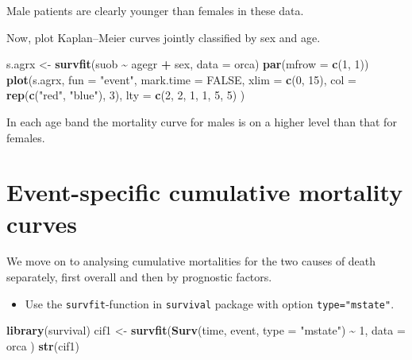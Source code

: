 \documentclass[
]{book}
\newenvironment{Shaded}{\begin{snugshade}}{\end{snugshade}}
\newcommand{\AttributeTok}[1]{\textcolor[rgb]{0.13,0.29,0.53}{#1}}
\newcommand{\ConstantTok}[1]{\textcolor[rgb]{0.56,0.35,0.01}{#1}}
\newcommand{\DecValTok}[1]{\textcolor[rgb]{0.00,0.00,0.81}{#1}}
\newcommand{\FunctionTok}[1]{\textcolor[rgb]{0.13,0.29,0.53}{\textbf{#1}}}
\newcommand{\NormalTok}[1]{#1}
\newcommand{\OtherTok}[1]{\textcolor[rgb]{0.56,0.35,0.01}{#1}}
\newcommand{\SpecialCharTok}[1]{\textcolor[rgb]{0.81,0.36,0.00}{\textbf{#1}}}
\newcommand{\StringTok}[1]{\textcolor[rgb]{0.31,0.60,0.02}{#1}}
\providecommand{\tightlist}{%
  \setlength{\itemsep}{0pt}\setlength{\parskip}{0pt}}
\begin{document}
Male patients are clearly younger than females in these data.

Now, plot Kaplan--Meier curves jointly classified by sex and age.

\begin{Shaded}
\begin{Highlighting}[]
\NormalTok{s.agrx }\OtherTok{\textless{}{-}} \FunctionTok{survfit}\NormalTok{(suob }\SpecialCharTok{\textasciitilde{}}\NormalTok{ agegr }\SpecialCharTok{+}\NormalTok{ sex, }\AttributeTok{data =}\NormalTok{ orca)}
\FunctionTok{par}\NormalTok{(}\AttributeTok{mfrow =} \FunctionTok{c}\NormalTok{(}\DecValTok{1}\NormalTok{, }\DecValTok{1}\NormalTok{))}
\FunctionTok{plot}\NormalTok{(s.agrx,}
  \AttributeTok{fun =} \StringTok{"event"}\NormalTok{, }\AttributeTok{mark.time =} \ConstantTok{FALSE}\NormalTok{, }\AttributeTok{xlim =} \FunctionTok{c}\NormalTok{(}\DecValTok{0}\NormalTok{, }\DecValTok{15}\NormalTok{),}
  \AttributeTok{col =} \FunctionTok{rep}\NormalTok{(}\FunctionTok{c}\NormalTok{(}\StringTok{"red"}\NormalTok{, }\StringTok{"blue"}\NormalTok{), }\DecValTok{3}\NormalTok{), }\AttributeTok{lty =} \FunctionTok{c}\NormalTok{(}\DecValTok{2}\NormalTok{, }\DecValTok{2}\NormalTok{, }\DecValTok{1}\NormalTok{, }\DecValTok{1}\NormalTok{, }\DecValTok{5}\NormalTok{, }\DecValTok{5}\NormalTok{)}
\NormalTok{)}
\end{Highlighting}
\end{Shaded}

In each age band the mortality curve for males is on a higher level
than that for females.

\section{Event-specific cumulative mortality curves}\label{event-specific-cumulative-mortality-curves}

We move on to analysing cumulative mortalities for the
two causes of death separately, first overall and then
by prognostic factors.

\begin{itemize}
\tightlist
\item
  Use the \texttt{survfit}-function in \texttt{survival} package with option \texttt{type="mstate"}.
\end{itemize}

\begin{Shaded}
\begin{Highlighting}[]
\FunctionTok{library}\NormalTok{(survival)}
\NormalTok{cif1 }\OtherTok{\textless{}{-}} \FunctionTok{survfit}\NormalTok{(}\FunctionTok{Surv}\NormalTok{(time, event, }\AttributeTok{type =} \StringTok{"mstate"}\NormalTok{) }\SpecialCharTok{\textasciitilde{}} \DecValTok{1}\NormalTok{,}
  \AttributeTok{data =}\NormalTok{ orca}
\NormalTok{)}
\FunctionTok{str}\NormalTok{(cif1)}
\end{Highlighting}
\end{Shaded}
\end{document}
